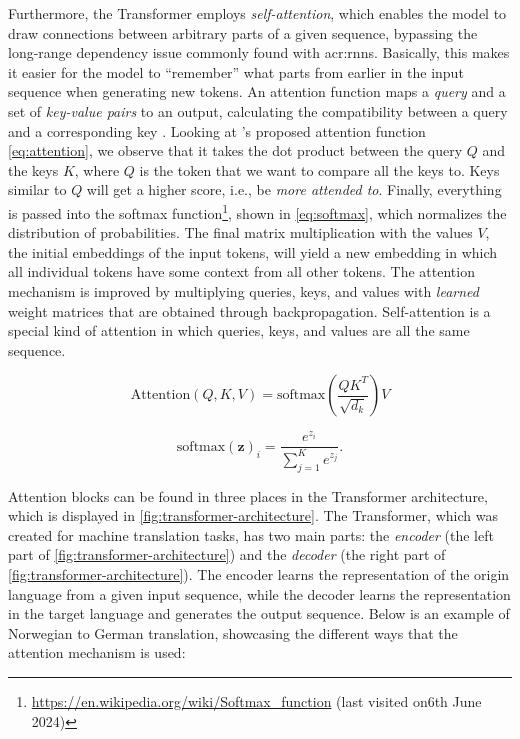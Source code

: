 Furthermore, the Transformer employs \textit{self-attention}, which enables the model to draw connections between arbitrary parts of a given sequence, bypassing the long-range dependency issue commonly found with \glspl{acr:rnn}. Basically, this makes it easier for the model to \enquote{remember} what parts from earlier in the input sequence when generating new tokens. An attention function maps a \textit{query} and a set of \textit{key-value pairs} to an output, calculating the compatibility between a query and a corresponding key \citep[3]{vaswaniAttentionAllYou2017}. Looking at \citeauthor{vaswaniAttentionAllYou2017}'s proposed attention function \eqref{eq:attention}, we observe that it takes the dot product between the query $Q$ and the keys $K$, where $Q$ is the token that we want to compare all the keys to. Keys similar to $Q$ will get a higher score, i.e., be \textit{more attended to}. Finally, everything is passed into the softmax function\footnote{\url{https://en.wikipedia.org/wiki/Softmax_function} (last visited on6th June 2024)}, shown in \eqref{eq:softmax}, which normalizes the distribution of probabilities. The final matrix multiplication with the values $V$, the initial embeddings of the input tokens, will yield a new embedding in which all individual tokens have some context from all other tokens. The attention mechanism is improved by multiplying queries, keys, and values with \textit{learned} weight matrices that are obtained through backpropagation. Self-attention is a special kind of attention in which queries, keys, and values are all the same sequence.

\begin{equation}
    \text{Attention}(Q, K, V) = \text{softmax}\left(\frac{QK^T}{\sqrt{d_k}}\right)V
    \label{eq:attention}
\end{equation}

\begin{equation}
    \text{softmax}(\mathbf{z})_i = \frac{e^{z_i}}{\sum_{j=1}^{K} e^{z_j}}.
    \label{eq:softmax}
\end{equation}

Attention blocks can be found in three places in the Transformer architecture, which is displayed in \autoref{fig:transformer-architecture}. The Transformer, which was created for machine translation tasks, has two main parts: the \textit{encoder} (the left part of \autoref{fig:transformer-architecture}) and the \textit{decoder} (the right part of \autoref{fig:transformer-architecture}). The encoder learns the representation of the origin language from a given input sequence, while the decoder learns the representation in the target language and generates the output sequence. Below is an example of Norwegian to German translation, showcasing the different ways that the attention mechanism is used:

